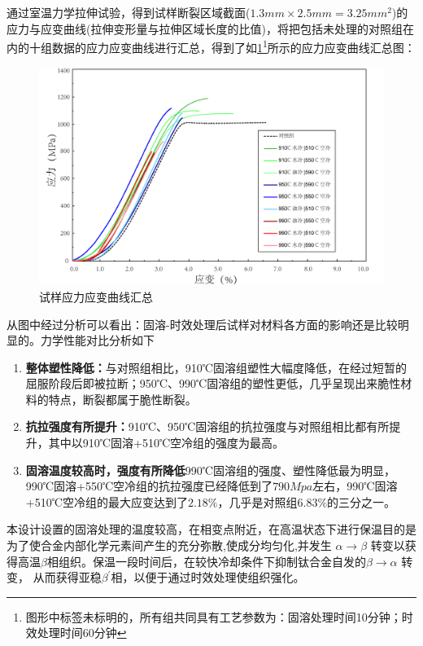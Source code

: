 通过室温力学拉伸试验，得到试样断裂区域截面($ 1.3mm\times2.5mm=3.25mm^2 $)的应力与应变曲线(拉伸变形量与拉伸区域长度的比值)，将把包括未处理的对照组在内的十组数据的应力应变曲线进行汇总，得到了如\ref{fig:试样应力应变曲线汇总}\footnote{图形中标签未标明的，所有组共同具有工艺参数为：固溶处理时间10分钟；时效处理时间60分钟}所示的应力应变曲线汇总图：
\begin{figure}[h!]
	\centering
	\includegraphics[width=0.99\linewidth]{pic/试样应力应变曲线汇总min.png}
	\caption{试样应力应变曲线汇总}
	\label{fig:试样应力应变曲线汇总}
\end{figure}
从图中经过分析可以看出：固溶-时效处理后试样对材料各方面的影响还是比较明显的。力学性能对比分析如下
\begin{enumerate}
	\item \textbf{整体塑性降低：}与对照组相比，910℃固溶组塑性大幅度降低，在经过短暂的屈服阶段后即被拉断；950℃、990℃固溶组的塑性更低，几乎呈现出来脆性材料的特点，断裂都属于脆性断裂。
	\item \textbf{抗拉强度有所提升：}910℃、950℃固溶组的抗拉强度与对照组相比都有所提升，其中以910℃固溶+510℃空冷组的强度为最高。
	\item \textbf{固溶温度较高时，强度有所降低}990℃固溶组的强度、塑性降低最为明显，990℃固溶+550℃空冷组的抗拉强度已经降低到了$ 790Mpa $左右，990℃固溶+510℃空冷组的最大应变达到了$ 2.18\% $，几乎是对照组$ 6.83\% $的三分之一。
\end{enumerate}

本设计设置的固溶处理的温度较高，在相变点附近，在高温状态下进行保温目的是为了使合金内部化学元素间产生的充分弥散,使成分均匀化,并发生 $\alpha\to\beta$ 转变以获得高温$ \beta $相组织。保温一段时间后，在较快冷却条件下抑制钛合金自发的$\beta\to \alpha$ 转变， 从而获得亚稳$ \beta^{\prime} $相，以便于通过时效处理使组织强化。

